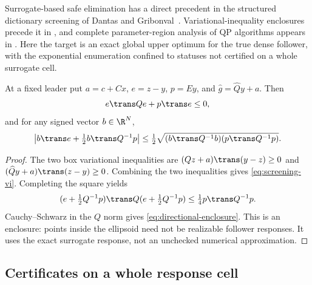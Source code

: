 Surrogate-based safe elimination has a direct precedent in the structured
dictionary screening of Dantas and Gribonval~\cite{DantasGribonval2019}.
Variational-inequality enclosures precede it in
\cite{LiuZhaoWangYe2014}, and complete parameter-region analysis of
QP algorithms appears in \cite{ArnstromAxehill2022}. Here the target
is an exact global upper optimum for the true dense follower, with the
exponential enumeration confined to statuses not certified on a whole
surrogate cell.

\begin{lemma}\label{lem:screening-enclosure}
At a fixed leader put $a=c+Cx$, $e=z-y$, $p=Ey$, and
$\widehat g=\widehat Qy+a$. Then
\begin{equation}\label{eq:screening-vi}
                  e\trans Qe+p\trans e\le0,
\end{equation}
and for any signed vector $b\in\R^N$,
\begin{equation}\label{eq:directional-enclosure}
 \left|b\trans e+\tfrac12b\trans Q^{-1}p\right|
       \le\tfrac12\sqrt{(b\trans Q^{-1}b)(p\trans Q^{-1}p)}.
\end{equation}
\end{lemma}
\begin{proof}
The two box variational inequalities are
$(Qz+a)\trans(y-z)\ge0$ and
$(\widehat Qy+a)\trans(z-y)\ge0$.
Combining the two inequalities gives \eqref{eq:screening-vi}. Completing the square yields
\[
 (e+\tfrac12Q^{-1}p)\trans Q(e+\tfrac12Q^{-1}p)
                         \le\tfrac14p\trans Q^{-1}p.
\]
Cauchy--Schwarz in the $Q$ norm gives
\eqref{eq:directional-enclosure}. This is an enclosure: points inside
the ellipsoid need not be realizable follower responses. It uses the
exact surrogate response, not an unchecked numerical approximation.
\end{proof}

\subsection{Certificates on a whole response cell}\label{subsec:whole-cell-screening}

